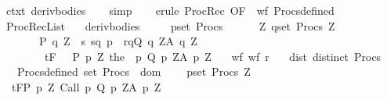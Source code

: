 \begin{isabellebody}
%
\isatagproof
{}\isamarkupfalse%
\ ctxt\ deriv{\isacharunderscore}bodies\isanewline
\ \ \isamarkupfalse%
\ simp\isanewline
\ \ \isamarkupfalse%
\ {\isacharparenleft}erule\ ProcRec\ {\isacharbrackleft}OF\ {\isacharunderscore}\ wf\ Procs{\isacharunderscore}defined{\isacharbrackright}{\isacharparenright}\isanewline
\ \ \isamarkupfalse%
%
\endisatagproof
{\isafoldproof}%
%
\isadelimproof
\isanewline
%
\endisadelimproof
\ \isanewline
\isanewline
{}\isamarkupfalse%
\ ProcRecList{\isacharcolon}\isanewline
\ \ \ deriv{\isacharunderscore}bodies{\isacharcolon}\ \ \isanewline
\ \ \ {\isachardoublequoteopen}{\isasymforall}p{\isasymin}set\ Procs{\isachardot}\ \isanewline
\ \ \ \ {\isasymforall}{\isasymsigma}\ Z{\isachardot}\ {\isasymGamma}{\isacharcomma}{\isasymTheta}{\isasymunion}{\isacharparenleft}{\isasymUnion}q{\isasymin}set\ Procs{\isachardot}\ {\isasymUnion}Z{\isachardot}\ \isanewline
\ \ \ \ \ \ \ {\isacharbraceleft}{\isacharparenleft}P\ q\ Z\ {\isasyminter}\ {\isacharbraceleft}s{\isachardot}\ {\isacharparenleft}{\isacharparenleft}s{\isacharcomma}q{\isacharparenright}{\isacharcomma}\ {\isasymsigma}{\isacharcomma}p{\isacharparenright}\ {\isasymin}\ r{\isacharbraceright}{\isacharcomma}q{\isacharcomma}Q\ q\ Z{\isacharcomma}A\ q\ Z{\isacharparenright}{\isacharbraceright}{\isacharparenright}\isanewline
\ \ \ \ \ \ \ \ {\isasymturnstile}\isactrlsub t\isactrlbsub {\isacharslash}F\isactrlesub \ {\isacharparenleft}{\isacharbraceleft}{\isasymsigma}{\isacharbraceright}\ {\isasyminter}\ P\ p\ Z{\isacharparenright}\ {\isacharparenleft}the\ {\isacharparenleft}{\isasymGamma}\ p{\isacharparenright}{\isacharparenright}\ {\isacharparenleft}Q\ p\ Z{\isacharparenright}{\isacharcomma}{\isacharparenleft}A\ p\ Z{\isacharparenright}{\isachardoublequoteclose}\isanewline
\ \ \ wf{\isacharcolon}\ {\isachardoublequoteopen}wf\ r{\isachardoublequoteclose}\isanewline
\ \ \ dist{\isacharcolon}\ {\isachardoublequoteopen}distinct\ Procs{\isachardoublequoteclose}\isanewline
\ \ \ Procs{\isacharunderscore}defined{\isacharcolon}\ {\isachardoublequoteopen}set\ Procs\ {\isasymsubseteq}\ dom\ {\isasymGamma}{\isachardoublequoteclose}\isanewline
\ \ \ {\isachardoublequoteopen}{\isasymforall}p{\isasymin}set\ Procs{\isachardot}\ {\isasymforall}Z{\isachardot}\ \ \isanewline
\ \ {\isasymGamma}{\isacharcomma}{\isasymTheta}{\isasymturnstile}\isactrlsub t\isactrlbsub {\isacharslash}F\isactrlesub {\isacharparenleft}P\ p\ Z{\isacharparenright}\ Call\ p\ {\isacharparenleft}Q\ p\ Z{\isacharparenright}{\isacharcomma}{\isacharparenleft}A\ p\ Z{\isacharparenright}{\isachardoublequoteclose}\isanewline

\end{isabellebody}
